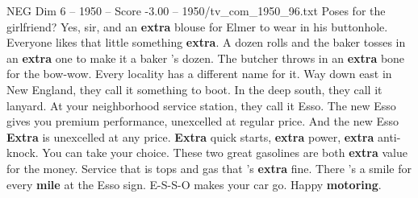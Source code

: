 \begin{textsample}{NEG Dim 6 – 1950 – Score -3.00 – 1950/tv\_com\_1950\_96.txt}  \label{ex:f6_neg_087}
Poses for the girlfriend?
Yes, sir, and an \textbf{extra} blouse for Elmer to wear in his buttonhole.
Everyone likes that little something \textbf{extra}.
A dozen rolls and the baker tosses in an \textbf{extra} one to make it a baker 's dozen.
The butcher throws in an \textbf{extra} bone for the bow-wow.
Every locality has a different name for it.
Way down east in New England, they call it something to boot.
In the deep south, they call it lanyard.
At your neighborhood service station, they call it Esso.
The new Esso gives you premium performance, unexcelled at regular price.
And the new Esso \textbf{Extra} is unexcelled at any price. \textbf{Extra} quick starts, \textbf{extra} power, \textbf{extra} anti-knock.
You can take your choice.
These two great gasolines are both \textbf{extra} value for the money.
Service that is tops and gas that 's \textbf{extra} fine.
There 's a smile for every \textbf{mile} at the Esso sign.
E-S-S-O makes your car go.
Happy \textbf{motoring}.

\end{textsample}
